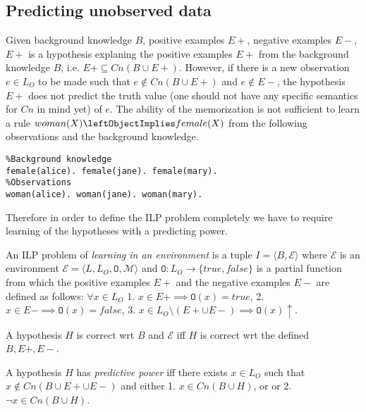 \subsection{Predicting unobserved data}
Given background knowledge $B$, positive examples $E+$, negative examples $E-$, $E+$ is a hypothesis explaning the positive examples $E+$ from the background knowledge $B$, i.e. $E+ \subseteq Cn(B \cup E+)$.
However, if there is a new observation $e \in L_O$ to be made such that
$e \not \in Cn(B \cup E+)$ and $e \not\in E-$, the hypothesis $E+$ does not predict the truth value (one should not have any specific semantics for $Cn$ in mind yet) of $e$. The ability of the memorization is not sufficient to learn a rule $woman(X) \leftObjectImplies female(X)$ from the following observations and the background knowledge.
\begin{exmp}
\begin{lstlisting}
%Background knowledge
female(alice). female(jane). female(mary).
%Observations
woman(alice). woman(jane). woman(mary).
\end{lstlisting}
\end{exmp}

Therefore in order to define the ILP problem completely we have to require learning of the hypotheses with a predicting power.

\begin{defn}
An ILP problem of \emph{learning in an environment} is a tuple $I=\langle B, \mathcal{E} \rangle$ where
$\mathcal{E}$ is an environment
$\mathcal{E}=\langle L, L_O, \mathtt{O}, \mathcal{M} \rangle$
and 
$\mathtt{O}:L_O \to \{true, false\}$ is a partial function from which the positive examples $E+$ and the negative examples $E-$ are defined as follows:
$\forall x \in L_O$
1. $x \in E+ \implies \mathtt{O}(x)=true$,
2. $x \in E- \implies \mathtt{O}(x)=false$,
3. $x \in L_O \setminus (E+ \cup E-) \implies \mathtt{O}(x)\uparrow$.
\end{defn}

\begin{defn}
A hypothesis $H$ is correct wrt $B$ and $\mathcal{E}$ iff
$H$ is correct wrt the defined $B, E+, E-$.
\end{defn}

\begin{defn}
A hypothesis $H$ has \emph{predictive power} iff there exists
$x \in L_O$ such that $x \not \in Cn(B \cup E+ \cup E-)$
and either 1. $x \in Cn(B \cup H)$, or
or 2. $\neg x \in Cn(B \cup H)$.
\end{defn}

